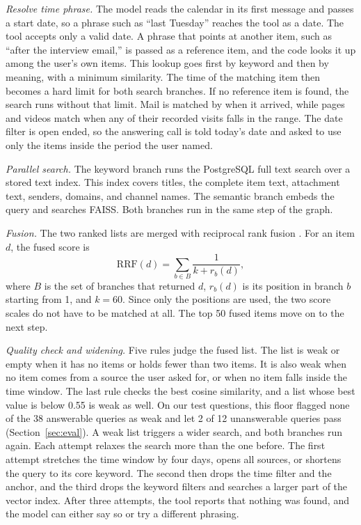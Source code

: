\documentclass[conference]{IEEEtran}
\begin{document}
\textit{Resolve time phrase.} The model reads the calendar in its first message and passes a start date, so a phrase such as ``last Tuesday'' reaches the tool as a date. The tool accepts only a valid date. A phrase that points at another item, such as ``after the interview email,'' is passed as a reference item, and the code looks it up among the user's own items. This lookup goes first by keyword and then by meaning, with a minimum similarity. The time of the matching item then becomes a hard limit for both search branches. If no reference item is found, the search runs without that limit. Mail is matched by when it arrived, while pages and videos match when any of their recorded visits falls in the range. The date filter is open ended, so the answering call is told today's date and asked to use only the items inside the period the user named.

\textit{Parallel search.} The keyword branch runs the PostgreSQL full text search over a stored text index. This index covers titles, the complete item text, attachment text, senders, domains, and channel names. The semantic branch embeds the query and searches FAISS. Both branches run in the same step of the graph.

\textit{Fusion.} The two ranked lists are merged with reciprocal rank fusion \cite{b9}. For an item $d$, the fused score is
\begin{equation}
\mathrm{RRF}(d) = \sum_{b \in B} \frac{1}{k + r_b(d)}, \label{eq:rrf}
\end{equation}
where $B$ is the set of branches that returned $d$, $r_b(d)$ is its position in branch $b$ starting from 1, and $k = 60$. Since only the positions are used, the two score scales do not have to be matched at all. The top 50 fused items move on to the next step.

\textit{Quality check and widening.} Five rules judge the fused list. The list is weak or empty when it has no items or holds fewer than two items. It is also weak when no item comes from a source the user asked for, or when no item falls inside the time window. The last rule checks the best cosine similarity, and a list whose best value is below 0.55 is weak as well. On our test questions, this floor flagged none of the 38 answerable queries as weak and let 2 of 12 unanswerable queries pass (Section~\ref{sec:eval}). A weak list triggers a wider search, and both branches run again. Each attempt relaxes the search more than the one before. The first attempt stretches the time window by four days, opens all sources, or shortens the query to its core keyword. The second then drops the time filter and the anchor, and the third drops the keyword filters and searches a larger part of the vector index. After three attempts, the tool reports that nothing was found, and the model can either say so or try a different phrasing.
\end{document}
